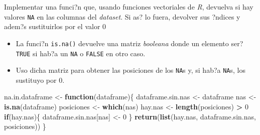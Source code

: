 \documentclass[
  ignorenonframetext,
]{beamer}
\newenvironment{Shaded}{\begin{snugshade}}{\end{snugshade}}
\newcommand{\ControlFlowTok}[1]{\textcolor[rgb]{0.13,0.29,0.53}{\textbf{#1}}}
\newcommand{\DecValTok}[1]{\textcolor[rgb]{0.00,0.00,0.81}{#1}}
\newcommand{\KeywordTok}[1]{\textcolor[rgb]{0.13,0.29,0.53}{\textbf{#1}}}
\newcommand{\NormalTok}[1]{#1}
\newcommand{\OperatorTok}[1]{\textcolor[rgb]{0.81,0.36,0.00}{\textbf{#1}}}
\newcommand{\StringTok}[1]{\textcolor[rgb]{0.31,0.60,0.02}{#1}}
\begin{document}
\begin{frame}[fragile]{Implementar una funci?n que, usando funciones
vectoriales de \emph{R}, devuelva si hay valores \texttt{NA} en las
columnas del \emph{dataset}. Si as? lo fuera, devolver sus ?ndices y
adem?s sustituirlos por el valor \(0\)}
\protect\hypertarget{implementar-una-funcin-que-usando-funciones-vectoriales-de-r-devuelva-si-hay-valores-na-en-las-columnas-del-dataset.-si-as-lo-fuera-devolver-sus-ndices-y-adems-sustituirlos-por-el-valor-0}{}

\begin{itemize}
\item
  La funci?n \texttt{is.na()} devuelve una matriz \emph{booleana} donde
  un elemento ser? \texttt{TRUE} si hab?a un \texttt{NA} o
  \texttt{FALSE} en otro caso.
\item
  Uso dicha matriz para obtener las posiciones de los \texttt{NA}s y, si
  hab?a \texttt{NA}s, los sustituyo por \(0\).
\end{itemize}

\begin{Shaded}
\begin{Highlighting}[]
\NormalTok{na.in.dataframe <-}\StringTok{ }\ControlFlowTok{function}\NormalTok{(dataframe)\{}
\NormalTok{  dataframe.sin.nas <-}\StringTok{ }\NormalTok{dataframe}
\NormalTok{  nas <-}\StringTok{ }\KeywordTok{is.na}\NormalTok{(dataframe) }
\NormalTok{  posiciones <-}\StringTok{ }\KeywordTok{which}\NormalTok{(nas)}
\NormalTok{  hay.nas <-}\StringTok{ }\KeywordTok{length}\NormalTok{(posiciones) }\OperatorTok{>}\StringTok{ }\DecValTok{0}
  \ControlFlowTok{if}\NormalTok{(hay.nas)\{ dataframe.sin.nas[nas] <-}\StringTok{ }\DecValTok{0}\NormalTok{ \}}
  \KeywordTok{return}\NormalTok{(}\KeywordTok{list}\NormalTok{(hay.nas, dataframe.sin.nas, posiciones))}
\NormalTok{\}}
\end{Highlighting}
\end{Shaded}

\end{frame}
\end{document}

